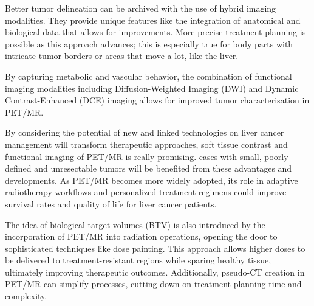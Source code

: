 

Better tumor delineation can be archived with the use of hybrid imaging modalities. They provide unique features like the integration of anatomical and biological data that allows for improvements. More precise treatment planning is possible as this approach advances; this is especially true for body parts with intricate tumor borders or areas that move a lot, like the liver.

By capturing metabolic and vascular behavior, the combination of functional imaging modalities including Diffusion-Weighted Imaging (DWI) and Dynamic Contrast-Enhanced (DCE) imaging allows for improved tumor characterisation in PET/MR.

By considering the potential of new and linked technologies on liver cancer management will transform therapeutic approaches, soft tissue contrast and functional imaging of PET/MR is really promising. cases with small, poorly defined and unresectable tumors will be benefited from these advantages and developments. As PET/MR becomes more widely adopted, its role in adaptive radiotherapy workflows and personalized treatment regimens could improve survival rates and quality of life for liver cancer patients.

The idea of biological target volumes (BTV) is also introduced by the incorporation of PET/MR into radiation operations, opening the door to sophisticated techniques like dose painting. This approach allows higher doses to be delivered to treatment-resistant regions while sparing healthy tissue, ultimately improving therapeutic outcomes. Additionally, pseudo-CT creation in PET/MR can simplify processes, cutting down on treatment planning time and complexity.


